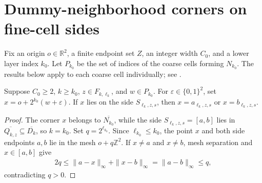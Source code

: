 \section{Dummy-neighborhood corners on fine-cell sides}
\label{sec:area_law_dummy_corners}

Fix an origin $o\in\mathbb R^2$, a finite endpoint set $Z$, an integer width
$C_0$, and a lower layer index $k_0$. Let $P_{k_0}$ be the set of indices of
the coarse cells forming $N_{k_0}$. The results below apply to each coarse
cell individually; see \cite[Section~11]{OpenAI2026AreaLaw}.


\begin{lemma}
    \label{thm:area_law_dummy_corner_side}
    \leanok
    Suppose $C_0\ge2$, $k\ge k_0$, $z\in F_{k,\ell_k}$, and
    $w\in P_{k_0}$. For $\varepsilon\in\{0,1\}^2$, set
    $x=o+2^{k_0}(w+\varepsilon)$. If $x$ lies on the side $S_{\ell_k,z,s}$,
    then $x=a_{\ell_k,z,s}$ or $x=b_{\ell_k,z,s}$.
\end{lemma}
\begin{proof}\leanok
    The corner $x$ belongs to $\overline{N_{k_0}}$, while the side
    $S_{\ell_k,z,s}=[a,b]$ lies in $\overline{Q_{k,z}}\subseteq\overline{D_k}$,
    so $k=k_0$. Set $q=2^{\ell_{k_0}}$. Since $\ell_{k_0}\le k_0$, the point
    $x$ and both side endpoints $a,b$ lie in the mesh $o+q\mathbb Z^2$. If
    $x\ne a$ and $x\ne b$, mesh separation and $x\in[a,b]$ give
    \begin{align}
        2q\le\|a-x\|_\infty+\|x-b\|_\infty
        =\|a-b\|_\infty\le q,
    \end{align}
    contradicting $q>0$.
\end{proof}


